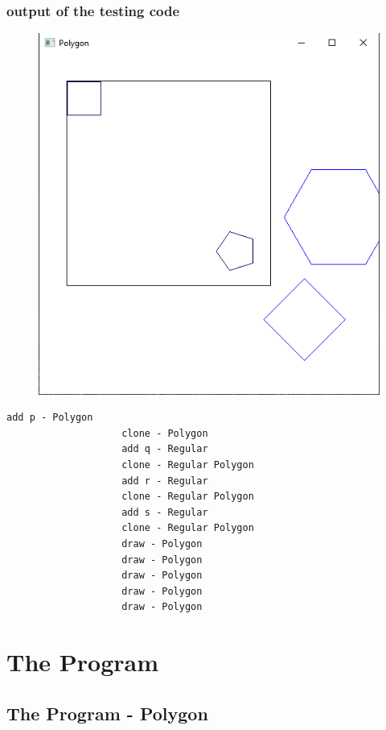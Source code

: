 \documentclass[11pt,titlepage]{article}
\begin{document}
			\subsubsection{output of the testing code}	
				\begin{figure}[h]
					\centering
					\includegraphics[scale=0.75]{Documentation/Problems/problem.png}
				\end{figure}
				
				\begin{lstlisting}[numbers=none]
					add p - Polygon
					clone - Polygon
					add q - Regular
					clone - Regular Polygon
					add r - Regular
					clone - Regular Polygon
					add s - Regular
					clone - Regular Polygon
					draw - Polygon
					draw - Polygon
					draw - Polygon
					draw - Polygon
					draw - Polygon
				\end{lstlisting}
	
\newpage
	\section{The Program}
	

		\subsection{The Program - Polygon}
\end{document}
